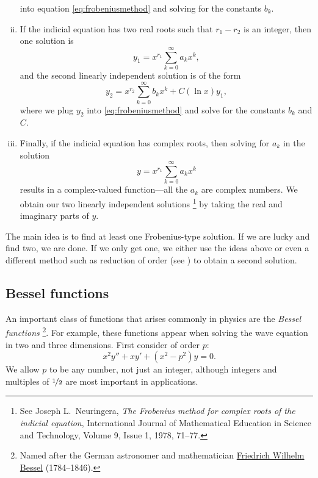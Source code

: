 \begin{enumerate}[(i)]
\begin{equation*}
\end{equation*}
into equation \eqref{eq:frobeniusmethod} and solving for the constants $b_k$.
\item
If the indicial equation has two real roots such that $r_1-r_2$ is
an integer, then one solution is
\begin{equation*}
y_1 = x^{r_1} \sum_{k=0}^\infty a_k x^{k} ,
\end{equation*}
and the second linearly independent solution is of the form
\begin{equation*}
y_2 = x^{r_2} \sum_{k=0}^\infty b_k x^{k} + C (\ln x) y_1 ,
\end{equation*}
where we plug $y_2$ into \eqref{eq:frobeniusmethod} and solve for the
constants $b_k$ and $C$.
\item
Finally, if the indicial equation has complex roots, then solving
for $a_k$ in the solution
\begin{equation*}
y = x^{r_1} \sum_{k=0}^\infty a_k x^{k}
\end{equation*}
results in a complex-valued function---all the $a_k$ are complex
numbers.  We obtain our two linearly independent
solutions%
\footnote{See 
Joseph L.\ Neuringera,
\emph{The Frobenius method for complex roots of the indicial equation},
International Journal of Mathematical Education in Science and Technology,
Volume 9, Issue 1, 1978, 71--77.}
by taking the real and imaginary parts of $y$.
\end{enumerate}

The main idea is to find at least one Frobenius-type solution.  If
we are lucky and find two, we are done.
If we only get one, we either use the ideas above or even a different method
such as reduction of order (see ) to
obtain a second solution.

\subsection{Bessel functions} \label{bessel:subsection}

An important class of functions that arises commonly in physics are the
\emph{Bessel functions}%
\footnote{Named after
the German astronomer and mathematician
\href{http://en.wikipedia.org/wiki/Friedrich_Bessel}{Friedrich Wilhelm
Bessel} (1784--1846).}.
For example, these functions appear when solving the
wave equation in two and three dimensions.  First consider
\emph{} of order $p$:
\begin{equation*}
x^2 y'' + xy' + \left(x^2 - p^2\right)y = 0 .
\end{equation*}
We allow $p$ to be any number, not just an integer, although integers
and multiples of $\nicefrac{1}{2}$ are most important in applications.


